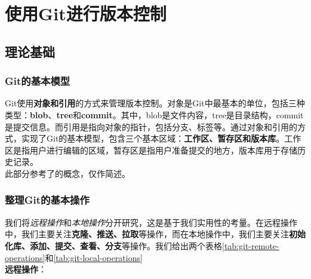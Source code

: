 \chapter{使用Git进行版本控制}
\label{cp:git}


\section{理论基础}

\subsection{Git的基本模型}

Git使用\textbf{对象和引用}的方式来管理版本控制。对象是Git中最基本的单位，包括三种类型：\textbf{blob}、\textbf{tree}和\textbf{commit}。其中，blob是文件内容，tree是目录结构，commit是提交信息。而引用是指向对象的指针，包括分支、标签等。通过对象和引用的方式，实现了Git的基本模型，包含三个基本区域：\textbf{工作区、暂存区和版本库}。工作区是指用户进行编辑的区域，暂存区是指用户准备提交的地方，版本库用于存储历史记录。\\

此部分参考了\citep{MissingSemester}的概念，仅作简述。

\subsection{整理Git的基本操作}

我们将\textit{远程操作}和\textit{本地操作}分开研究，这是基于我们实用性的考量。在远程操作中，我们主要关注\textbf{克隆、推送、拉取}等操作，而在本地操作中，我们主要关注\textbf{初始化库、添加、提交、查看、分支}等操作。我们给出两个表格\autoref{tab:git-remote-operations}和\autoref{tab:git-local-operations}\\

\textbf{远程操作}：\\


